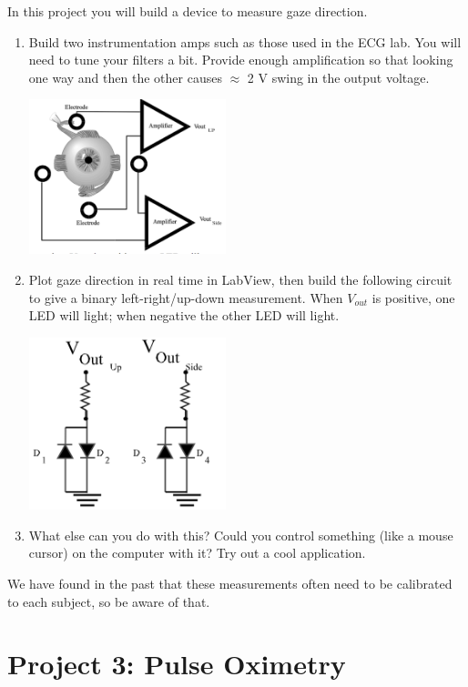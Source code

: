 \documentclass[12pt]{article}
\begin{document}
In this project you will build a device to measure gaze direction. 
\begin{enumerate}
\item Build two instrumentation amps such as those used in the ECG lab. You will need to tune your filters a bit.
Provide enough amplification so that looking one way and then the other causes $\approx$ 2 V swing in the output voltage. 
\begin{center}
\includegraphics[width=0.45\textwidth]{EOGcircuit.png}
\end{center}
\item Plot gaze direction in real time in LabView, then build the following circuit to give a binary left-right/up-down measurement.
When $V_{out}$ is positive, one LED will light; when negative the other LED will light.
\begin{center}
\includegraphics[width=0.45\textwidth]{EOGLEDs.png}
\end{center}
\item What else can you do with this? Could you control something (like a mouse cursor) on the computer with it? Try out a cool application.
\end{enumerate}

We have found in the past that these measurements often need to be calibrated to each subject, so be aware of that. 

\newpage 

\section*{Project 3: Pulse Oximetry}
\end{document}
